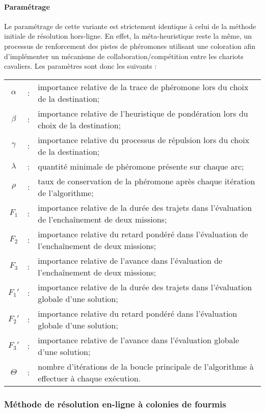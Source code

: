 \paragraph{Paramétrage}

Le paramétrage de cette variante est strictement identique à celui de la méthode initiale de résolution hors-ligne. En effet, la méta-heuristique reste la même, un processus de renforcement des pistes de phéromones utilisant une coloration afin d'implémenter un mécanisme de collaboration/compétition entre les chariots cavaliers. Les paramètres sont donc les suivants : 
\begin{tabular}{ccp{}}
 $\alpha$ &:& importance relative de la trace de phéromone lors du choix de la destination;\\
 $\beta$ &:& importance relative de l'heuristique de pondération lors du choix de la destination;\\
 $\gamma$ &:& importance relative du processus de répulsion lors du choix de la destination;\\
 $\lambda$ &:& quantité minimale de phéromone présente sur chaque arc;\\
 $\rho$ &:& taux de conservation de la phéromone après chaque itération de l'algorithme;\\
 $F_1$ &:& importance relative de la durée des trajets dans l'évaluation de l'enchaînement de deux missions;\\
 $F_2$ &:& importance relative du retard pondéré dans l'évaluation de l'enchaînement de deux missions;\\
 $F_3$ &:& importance relative de l'avance dans l'évaluation de l'enchaînement de deux missions;\\
 $F_1'$ &:& importance relative de la durée des trajets dans l'évaluation globale d'une solution;\\
 $F_2'$ &:& importance relative du retard pondéré dans l'évaluation globale d'une solution;\\
 $F_3'$ &:& importance relative de l'avance dans l'évaluation globale d'une solution;\\
 $\Theta$ &:& nombre d'itérations de la boucle principale de l'algorithme à effectuer à chaque exécution.
\end{tabular}


\subsubsection{Méthode de résolution en-ligne à colonies de fourmis}\label{chap:ordo:reso:onlineACO}

